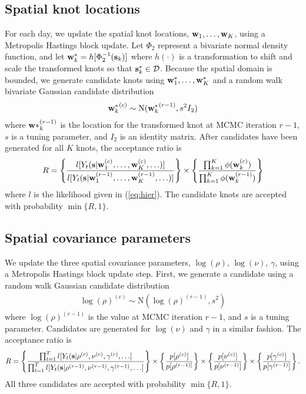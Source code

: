 \documentclass[11pt]{article}
\begin{document}
\subsection*{Spatial knot locations}
For each day, we update the spatial knot locations, $\mbox{\bf w}_1, \ldots, \mbox{\bf w}_K$, using a Metropolis Hastings block update.
Let $\Phi_2$ represent a bivariate normal density function, and let $\mbox{\bf w}^*_k = h[\Phi_2^{-1}(\mbox{\bf s}_k)]$ where $h(\cdot)$ is a transformation to shift and scale the transformed knots so that $\mbox{\bf s}^*_k \in {\cal D}$.
Because the spatial domain is bounded, we generate candidate knots using $\mbox{\bf w}^*_1, \ldots, \mbox{\bf w}^*_K$ and a random walk bivariate Gaussian candidate distribution
\begin{align*}
	{ \mbox{\bf w}^*_k}^{(c)} \sim \text{N}({\mbox{\bf w}^*_k}^{(r - 1)}, s^2 I_2)
\end{align*}
where $\mbox{\bf w}*_k^{(r - 1)}$ is the location for the transformed knot at MCMC iteration $r - 1$, $s$ is a tuning parameter, and $I_2$ is an identity matrix.
After candidates have been generated for all $K$ knots, the acceptance ratio is
\begin{align*}
  R = \left\{ \frac{ l[ Y_t(\mbox{\bf s} | \mbox{\bf w}_1^{(c)}, \ldots, \mbox{\bf w}_K^{(c)}, \ldots)] }{l[ Y_t(\mbox{\bf s} | \mbox{\bf w}_1^{(r - 1)}, \ldots, \mbox{\bf w}_K^{(r - 1)}, \ldots)]} \right\} \times \left\{ \frac{ \prod_{k = 1}^{K}\phi(\mbox{\bf w}_k^{(c)})}{ \prod_{k = 1}^{K}\phi(\mbox{\bf w}_k^{(r - 1)})} \right\}
\end{align*}
where $l$ is the likelihood given in (\ref{eq:hier}).
The candidate knots are accepted with probability $\min\{R, 1\}$.

\subsection*{Spatial covariance parameters}
We update the three spatial covariance parameters, $\log(\rho)$, $\log(\nu)$, $\gamma$, using a Metropolis Hastings block update step.
First, we generate a candidate using a random walk Gaussian candidate distribution
\begin{align*}
	\log(\rho)^{(c)} \sim \text{N}(\log(\rho)^{(r - 1)}, s^2)
\end{align*}
where $\log(\rho)^{(r-1)}$ is the value at MCMC iteration $r - 1$, and $s$ is a tuning parameter.
Candidates are generated for $\log(\nu)$ and $\gamma$ in a similar fashion.
The acceptance ratio is
\begin{align*}
	R = \left\{ \frac{ \prod_{t = 1}^{T} l[Y_t(\mbox{\bf s} | \rho^{(c)}, \nu^{(c)}, \gamma^{(c)}, \ldots] }{\prod_{t = 1}^{T} l[Y_t(\mbox{\bf s} | \rho^{(r-1)}, \nu^{(r-1)}, \gamma^{(r-1)}, \ldots] } \right\} \times \left\{ \frac{ p[\rho^{(c)}] }{ p[\rho^{(r - 1)] } } \right\} \times \left\{ \frac{ p[\nu^{(c)}] }{ p[\nu^{(r - 1)}] } \right\} \times \left\{ \frac{ p[ \gamma^{(c)} ] }{ p[\gamma^{(r - 1)} ] } \right\}.
\end{align*}
All three candidates are accepted with probability $\min\{R, 1\}$.
\end{document}
